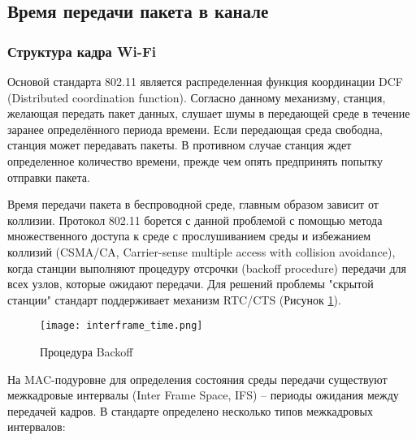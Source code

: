 \subsection{Время передачи пакета в канале}


\subsubsection{Структура кадра Wi-Fi}
 Основой стандарта 802.11 является распределенная функция координации DCF (Distributed coordination function). Согласно данному механизму, станция, желающая передать пакет данных, слушает шумы в передающей среде в течение заранее определённого периода времени. Если передающая среда свободна, станция может передавать пакеты. В противном случае станция ждет определенное количество времени, прежде чем опять предпринять попытку отправки пакета.

 Время передачи пакета в беспроводной среде, главным образом зависит от коллизии. Протокол 802.11 борется с данной проблемой с помощью метода множественного доступа к среде с прослушиванием среды и избежанием коллизий (CSMA/CA, Carrier-sense multiple access with collision avoidance), когда станции выполняют процедуру отсрочки (backoff procedure) передачи для всех узлов, которые ожидают передачи. Для решений проблемы "скрытой станции" стандарт поддерживает механизм RTC/CTS (Рисунок \cref{fig:part1_interframe_time}).

\begin{figure}[h!]
  \centering
   \texttt{[image: interframe\_time.png]}
\caption{Процедура Backoff}
\label{fig:part1_interframe_time}
\end{figure}

На MAC-подуровне  для определения состояния среды передачи существуют межкадровые интервалы (Inter Frame Space, IFS) -- периоды ожидания между передачей кадров. В стандарте определено несколько типов межкадровых интервалов:

